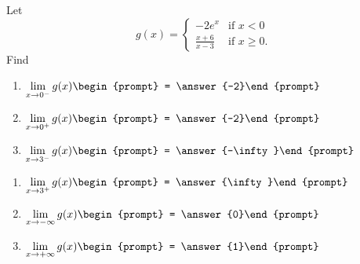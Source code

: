 \documentclass{ximera}
\author{Matthew Carr}
\begin{document}
\begin{exercise}


Let
\[
g(x)=\begin{cases}
-2e^{x} & \text{if }x<0\\
\frac{x+6}{x-3} & \text{if }x\ge0.
\end{cases}
\]
Find
\noindent\begin{minipage}[t]{.5\linewidth}
\begin{enumerate}
\item		$\lim_{x\to 0^{-}} g(x)\begin{prompt} = \answer{-2}\end{prompt}$
\item		$\lim_{x\to 0^+} g(x)\begin{prompt} = \answer{-2}\end{prompt}$
\item		$\lim_{x\to 3^{-}} g(x)\begin{prompt} = \answer{-\infty}\end{prompt}$
\end{enumerate}
\end{minipage}
\noindent\begin{minipage}[t]{.5\linewidth}
\begin{enumerate}\addtocounter{enumi}{3}
\item		$\lim_{x\to 3^{+}} g(x)\begin{prompt} = \answer{\infty}\end{prompt}$
\item		$\lim_{x\to -\infty} g(x)\begin{prompt} = \answer{0}\end{prompt}$
\item		$\lim_{x\to +\infty} g(x)\begin{prompt} = \answer{1}\end{prompt}$
\end{enumerate}
\end{minipage}


\end{exercise}
\end{document}
